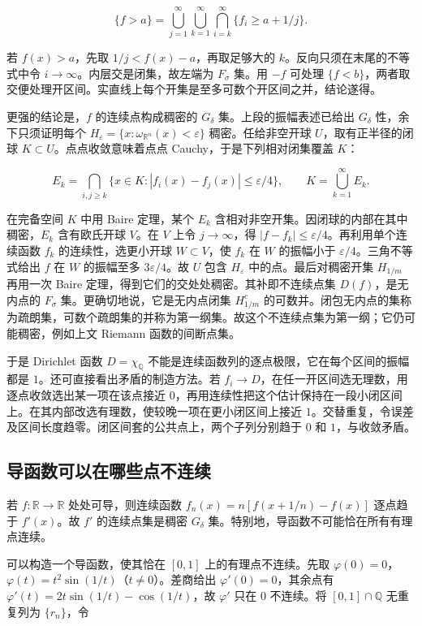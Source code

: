 \documentclass[11pt,a4paper]{article}
\begin{document}
\[
\{f>a\}
 =\bigcup_{j=1}^{\infty}\bigcup_{k=1}^{\infty}
   \bigcap_{i=k}^{\infty}\{f_i\ge a+1/j\}.
\]

若 \(f(x)>a\)，先取 \(1/j<f(x)-a\)，再取足够大的 \(k\)。反向只须在末尾的不等式中令 \(i\to\infty\)。内层交是闭集，故左端为 \(F_\sigma\) 集。用 \(-f\) 可处理 \(\{f<b\}\)，两者取交便处理开区间。实直线上每个开集是至多可数个开区间之并，结论遂得。

更强的结论是，\(f\) 的连续点构成稠密的 \(G_\delta\) 集。上段的振幅表述已给出 \(G_\delta\) 性，余下只须证明每个 \(H_\varepsilon=\{x:\omega_{\mathbb R^n}(x)<\varepsilon\}\) 稠密。任给非空开球 \(U\)，取有正半径的闭球 \(K\subset U\)。点点收敛意味着点点 Cauchy，于是下列相对闭集覆盖 \(K\)：

\[
E_k=\bigcap_{i,j\ge k}\{x\in K:|f_i(x)-f_j(x)|\le\varepsilon/4\},
\qquad K=\bigcup_{k=1}^{\infty}E_k .
\]

在完备空间 \(K\) 中用 Baire 定理，某个 \(E_k\) 含相对非空开集。因闭球的内部在其中稠密，\(E_k\) 含有欧氏开球 \(V\)。在 \(V\) 上令 \(j\to\infty\)，得 \(|f-f_k|\le\varepsilon/4\)。再利用单个连续函数 \(f_k\) 的连续性，选更小开球 \(W\subset V\)，使 \(f_k\) 在 \(W\) 的振幅小于 \(\varepsilon/4\)。三角不等式给出 \(f\) 在 \(W\) 的振幅至多 \(3\varepsilon/4\)。故 \(U\) 包含 \(H_\varepsilon\) 中的点。最后对稠密开集 \(H_{1/m}\) 再用一次 Baire 定理，得到它们的交处处稠密。其补即不连续点集 \(D(f)\)，是无内点的 \(F_\sigma\) 集。更确切地说，它是无内点闭集 \(H_{1/m}^c\) 的可数并。闭包无内点的集称为疏朗集，可数个疏朗集的并称为第一纲集。故这个不连续点集为第一纲；它仍可能稠密，例如上文 Riemann 函数的间断点集。

于是 Dirichlet 函数 \(D=\chi_{\mathbb Q}\) 不能是连续函数列的逐点极限，它在每个区间的振幅都是 \(1\)。还可直接看出矛盾的制造方法。若 \(f_i\to D\)，在任一开区间选无理数，用逐点收敛选出某一项在该点接近 \(0\)，再用连续性把这个估计保持在一段小闭区间上。在其内部改选有理数，使较晚一项在更小闭区间上接近 \(1\)。交替重复，令误差及区间长度趋零。闭区间套的公共点上，两个子列分别趋于 \(0\) 和 \(1\)，与收敛矛盾。

\subsection{导函数可以在哪些点不连续}

若 \(f:\mathbb R\to\mathbb R\) 处处可导，则连续函数 \(f_n(x)=n[f(x+1/n)-f(x)]\) 逐点趋于 \(f'(x)\)。故 \(f'\) 的连续点集是稠密 \(G_\delta\) 集。特别地，导函数不可能恰在所有有理点连续。

可以构造一个导函数，使其恰在 \([0,1]\) 上的有理点不连续。先取 \(\varphi(0)=0\)，\(\varphi(t)=t^2\sin(1/t)\)（\(t\ne0\)）。差商给出 \(\varphi'(0)=0\)，其余点有 \(\varphi'(t)=2t\sin(1/t)-\cos(1/t)\)，故 \(\varphi'\) 只在 \(0\) 不连续。将 \([0,1]\cap\mathbb Q\) 无重复列为 \(\{r_n\}\)，令
\end{document}
